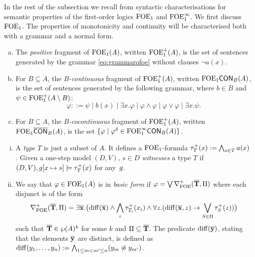 
In the rest of the subsection we recall from \cite{CFVZ-ModelTheoryPaper} syntactic characterisations for semantic properties of the first-order logics $\mathrm{FOE}_1$ and $\mathrm{FOE}^{\infty}_1$. We first discuss $\mathrm{FOE}_1$. The properties of monotonicity and continuity will be characterised both with a grammar and a normal form.

\begin{definition}
\begin{enumerate}[(a)]
\item The \emph{positive} fragment of $\mathrm{FOE}_1(A)$, written $\mathrm{FOE}_1^{+}(A)$, is the set of sentences generated by the grammar \eqref{eq:grammarofoe} without clauses $\lnot a(x)$. 
\item For $B \subseteq A$, the \emph{$B$-continuous} fragment of $\mathrm{FOE}_1^{+}(A)$, written $\mathrm{FOE}_1\mathsf{CON}_{B}(A)$, is the set of sentences generated by the following grammar, where $b \in B$ and $\psi \in \mathrm{FOE}_1^{+}(A \setminus B)$:
\[
\varphi ::= \psi \mid b(x) \mid \exists x.\varphi \mid \varphi \land \varphi \mid \varphi \lor \varphi \mid \exists x. \psi.
\]
\item For $B \subseteq A$, the \emph{$B$-cocontinuous} fragment of $\mathrm{FOE}_1^{+}(A)$, written $\mathrm{FOE}_1\overline{\mathsf{CON}}_{B}(A)$, is the set $\{\varphi \mid \varphi^\delta \in \mathrm{FOE}^{\infty}_1\mathsf{CON}_{B}(A)\}$.
\end{enumerate}
\end{definition}

\begin{definition}%
\label{def:basicform-ofoe}
\begin{enumerate}[(i)]
\item A \emph{type} $T$ is just a subset of $A$. It defines a $\mathrm{FOE}_1$-formula $\tau^{+}_T(x) \mathrel{: =} \bigwedge_{a \in T} a(x)$. Given a one-step model $(D,V)$, $s \in D$ \emph{witnesses} a type $T$ if $(D,V), g[x\mapsto s] \models \tau^{+}_T(x)$ for any~$g$.
\item We say that $\varphi \in \mathrm{FOE}_1(A)$ is in \emph{basic form} if $\varphi = \bigvee \nabla^+_{\mathrm{FOE}}(\overline{{\mathbf{T}}},\Pi)$ where each disjunct is of the form
%
\begin{equation*}%
\posdbnfofoe{\vlist{T}}{\Pi} = \exists \vlist{x}.\big(\arediff{\vlist{x}} \land \bigwedge_i \tau^{+}_{T_i}(x_i) \land \forall z.(\arediff{\vlist{x},z} \lthen \bigvee_{S\in \Pi} \tau^{+}_S(z))\big)
\end{equation*}
%
such that $\overline{{\mathbf{T}}} \in \wp(A)^k$ for some $k$ and $\Pi \subseteq \overline{{\mathbf{T}}}$.  The predicate $\mathrm{diff}(\overline{{\mathbf{y}}})$, stating that the elements $\overline{{\mathbf{y}}}$ are distinct, is defined as $\mathrm{diff}(y_1,\dots,y_n) := \bigwedge_{1\leq m < m^{\prime} \leq n} (y_m \not\approx y_{m^{\prime}})$.
\end{enumerate}
\end{definition}

